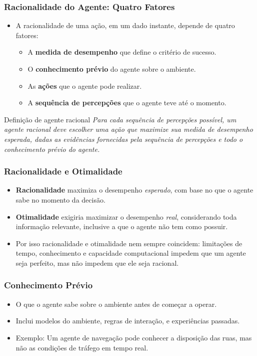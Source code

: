 \documentclass{beamer}
\begin{document}
\begin{frame}
\frametitle{Racionalidade do Agente: Quatro Fatores}
\footnotesize
\begin{itemize}
    \item A racionalidade de uma ação, em um dado instante, depende de quatro fatores:
    \begin{itemize}
        \item A \textbf{medida de desempenho} que define o critério de sucesso.
        \item O \textbf{conhecimento prévio} do agente sobre o ambiente.
        \item As \textbf{ações} que o agente pode realizar.
        \item A \textbf{sequência de percepções} que o agente teve até o momento.
    \end{itemize}
\end{itemize}
\begin{block}{Definição de agente racional}
\textit{Para cada sequência de percepções possível, um agente racional deve escolher uma ação que maximize sua medida de desempenho esperada, dadas as evidências fornecidas pela sequência de percepções e todo o conhecimento prévio do agente.}
\end{block}
\end{frame}

\begin{frame}
\frametitle{Racionalidade e Otimalidade}
\begin{itemize}
    \item \textbf{Racionalidade} maximiza o desempenho \textit{esperado}, com base no que o agente sabe no momento da decisão.
    \item \textbf{Otimalidade} exigiria maximizar o desempenho \textit{real}, considerando toda informação relevante, inclusive a que o agente não tem como possuir.
    \item Por isso racionalidade e otimalidade nem sempre coincidem: limitações de tempo, conhecimento e capacidade computacional impedem que um agente seja perfeito, mas não impedem que ele seja racional.
\end{itemize}
\end{frame}

\begin{frame}
\frametitle{Conhecimento Prévio}
\begin{itemize}
    \item O que o agente sabe sobre o ambiente antes de começar a operar.
    \item Inclui modelos do ambiente, regras de interação, e experiências passadas.
    \item Exemplo: Um agente de navegação pode conhecer a disposição das ruas, mas não as condições de tráfego em tempo real.
\end{itemize}
\end{frame}
\end{document}
